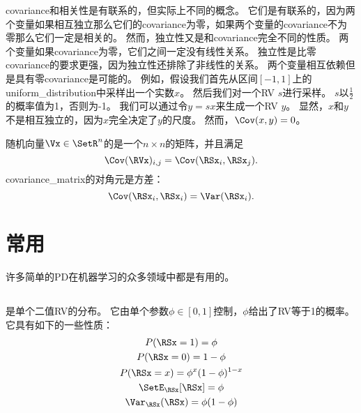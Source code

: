 \gls{covariance}和相关性是有联系的，但实际上不同的概念。
它们是有联系的，因为两个变量如果相互独立那么它们的\gls{covariance}为零，如果两个变量的\gls{covariance}不为零那么它们一定是相关的。
然而，独立性又是和\gls{covariance}完全不同的性质。
两个变量如果\gls{covariance}为零，它们之间一定没有线性关系。
独立性是比零\gls{covariance}的要求更强，因为独立性还排除了非线性的关系。
两个变量相互依赖但是具有零\gls{covariance}是可能的。
例如，假设我们首先从区间$[-1, 1]$上的\gls{uniform_distribution}中采样出一个实数$x$。
然后我们对一个\gls{RV} $s$进行采样。
$s$以$\frac{1}{2}$的概率值为1，否则为-1。
我们可以通过令$y=sx$来生成一个\gls{RV} $y$。
显然，$x$和$y$不是相互独立的，因为$x$完全决定了$y$的尺度。
然而，$\Cov(x,y)=0$。


随机向量$\Vx \in \SetR^n$的是一个$n\times n$的矩阵，并且满足
\begin{equation}
\Cov(\RVx)_{i,j} = \Cov(\RSx_i, \RSx_j).
\end{equation}
\gls{covariance_matrix}的对角元是方差：
\begin{equation}
\Cov(\RSx_i, \RSx_i) = \Var(\RSx_i).
\end{equation}

\section{常用}
\label{sec:common_probability_distributions}

许多简单的\gls{PD}在机器学习的众多领域中都是有用的。

\subsection{}
\label{sec:bernoulli_distribution}

是单个二值\gls{RV}的分布。
它由单个参数$\phi \in [0, 1]$控制，$\phi$给出了\gls{RV}等于1的概率。
它具有如下的一些性质：
\begin{gather}
P(\RSx =1) = \phi\\
P(\RSx =0) = 1-\phi\\
P(\RSx = x) = \phi^x (1-\phi)^{1-x}\\
\SetE_{\RSx}[\RSx] = \phi\\
\Var_{\RSx}(\RSx) = \phi(1-\phi)
\end{gather}

\subsection{}
\label{sec:multinoulli_distribution}

